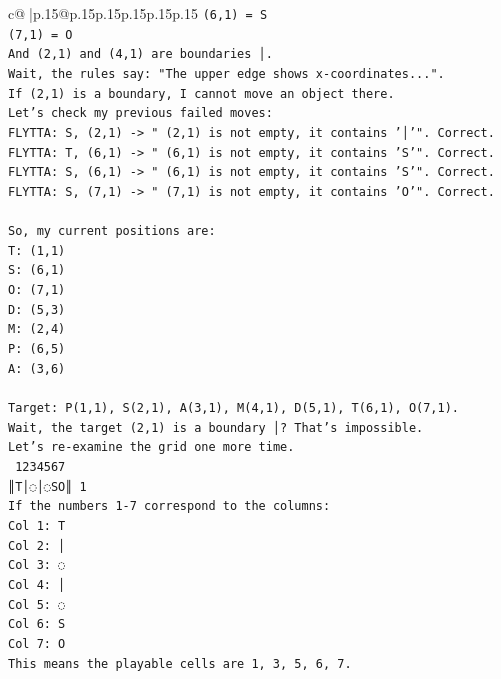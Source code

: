 \documentclass{article}
\begin{document}
{\begin{supertabular}{c@{$\;$}|p{.15\linewidth}@{}p{.15\linewidth}p{.15\linewidth}p{.15\linewidth}p{.15\linewidth}p{.15\linewidth}}
{{{\texttt{(6,1) = S} \\
\texttt{(7,1) = O} \\
\texttt{And (2,1) and (4,1) are boundaries │.} \\
\texttt{Wait, the rules say: "The upper edge shows x{-}coordinates...".} \\
\texttt{If (2,1) is a boundary, I cannot move an object there.} \\
\texttt{Let's check my previous failed moves:} \\
\texttt{FLYTTA: S, (2,1) {-}> " (2,1) is not empty, it contains '│'". Correct.} \\
\texttt{FLYTTA: T, (6,1) {-}> " (6,1) is not empty, it contains 'S'". Correct.} \\
\texttt{FLYTTA: S, (6,1) {-}> " (6,1) is not empty, it contains 'S'". Correct.} \\
\texttt{FLYTTA: S, (7,1) {-}> " (7,1) is not empty, it contains 'O'". Correct.} \\
\\ 
\texttt{So, my current positions are:} \\
\texttt{T: (1,1)} \\
\texttt{S: (6,1)} \\
\texttt{O: (7,1)} \\
\texttt{D: (5,3)} \\
\texttt{M: (2,4)} \\
\texttt{P: (6,5)} \\
\texttt{A: (3,6)} \\
\\ 
\texttt{Target: P(1,1), S(2,1), A(3,1), M(4,1), D(5,1), T(6,1), O(7,1).} \\
\texttt{Wait, the target (2,1) is a boundary │? That's impossible.} \\
\texttt{Let's re{-}examine the grid one more time.} \\
\texttt{ 1234567} \\
\texttt{║T│◌│◌SO║ 1} \\
\texttt{If the numbers 1{-}7 correspond to the columns:} \\
\texttt{Col 1: T} \\
\texttt{Col 2: │} \\
\texttt{Col 3: ◌} \\
\texttt{Col 4: │} \\
\texttt{Col 5: ◌} \\
\texttt{Col 6: S} \\
\texttt{Col 7: O} \\
\texttt{This means the playable cells are 1, 3, 5, 6, 7.} \\
}}}
\end{supertabular}}
\end{document}
